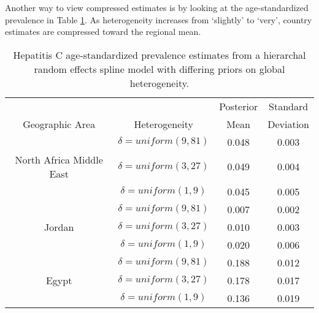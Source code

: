 Another way to view compressed estimates is by looking at the
age-standardized prevalence in Table \ref{tab:app-hepc global rfx}.
As heterogeneity increases from `slightly' to `very', country
estimates are compressed toward the regional mean.

    \begin{table}[h]
        \begin{center}
        \caption{ Hepatitis C age-standardized prevalence estimates from a hierarchal random effects spline model with differing priors on global heterogeneity.}
        \label{tab:app-hepc global rfx}
        \begin{tabular}{|c|c|c|c|}
            \hline
                & & Posterior & Standard \\
                Geographic Area & Heterogeneity & Mean & Deviation \\
            \hline
                & $\delta = uniform(9,81)$ & 0.048 & 0.003 \\
                North Africa Middle East & $\delta = uniform(3,27)$ & 0.049 & 0.004 \\
                & $\delta = uniform(1,9)$ & 0.045 & 0.005 \\
            \hline
                & $\delta = uniform(9,81)$ & 0.007 & 0.002 \\
                Jordan & $\delta = uniform(3,27)$ & 0.010 & 0.003 \\
                & $\delta = uniform(1,9)$ & 0.020 & 0.006 \\
            \hline
                & $\delta = uniform(9,81)$ & 0.188 & 0.012 \\
                Egypt & $\delta = uniform(3,27)$ & 0.178 & 0.017 \\
                & $\delta = uniform(1,9)$ & 0.136 & 0.019 \\
            \hline
        \end{tabular}
        \end{center}
    \end{table}
